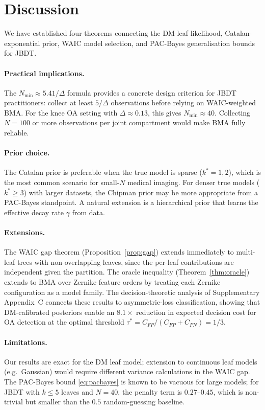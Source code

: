 \documentclass[ba]{imsart}
\theoremstyle{plain}
\theoremstyle{definition}
\theoremstyle{remark}
\newcommand{\Nmin}{N_{\min}}
\begin{document}
\section{Discussion}
\label{sec:discussion}

We have established four theorems connecting the DM-leaf likelihood,
Catalan-exponential prior, WAIC model selection, and PAC-Bayes
generalisation bounds for JBDT.

\paragraph{Practical implications.}
The $\Nmin \approx 5.41/\Delta$ formula provides a concrete design criterion
for JBDT practitioners: collect at least $5/\Delta$ observations before
relying on WAIC-weighted BMA.
For the knee OA setting with $\Delta \approx 0.13$, this gives $N_{\min} \approx 40$.
Collecting $N=100$ or more observations per joint compartment would make BMA
fully reliable.

\paragraph{Prior choice.}
The Catalan prior is preferable when the true model is sparse ($k^*=1,2$),
which is the most common scenario for small-$N$ medical imaging.
For denser true models ($k^*\geq 3$) with larger datasets, the Chipman prior
may be more appropriate from a PAC-Bayes standpoint.
A natural extension is a hierarchical prior that learns the effective
decay rate $\gamma$ from data.

\paragraph{Extensions.}
The WAIC gap theorem (Proposition~\ref{prop:gap}) extends immediately to
multi-leaf trees with non-overlapping leaves, since the per-leaf contributions
are independent given the partition.
The oracle inequality (Theorem~\ref{thm:oracle}) extends to BMA over Zernike
feature orders \citep{jakaite2021} by treating each Zernike configuration
as a model family.
The decision-theoretic analysis of Supplementary Appendix~C connects
these results to asymmetric-loss classification, showing that DM-calibrated
posteriors enable an $8.1\times$ reduction in expected decision cost for OA
detection at the optimal threshold $\tau^* = C_{FP}/(C_{FP}+C_{FN}) = 1/3$.

\paragraph{Limitations.}
Our results are exact for the DM leaf model; extension to continuous leaf
models (e.g.\ Gaussian) would require different variance calculations in the WAIC gap.
The PAC-Bayes bound \eqref{eq:pacbayes} is known to be vacuous for large models;
for JBDT with $k \leq 5$ leaves and $N = 40$, the penalty term is $0.27$--$0.45$,
which is non-trivial but smaller than the $0.5$ random-guessing baseline.



\end{document}
